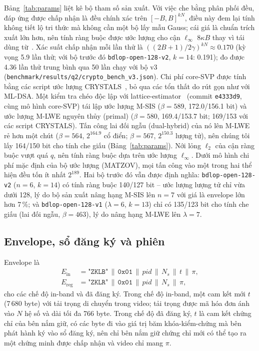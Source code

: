 \documentclass[journal]{IEEEtran}
\newcommand{\pid}{\mathit{pid}}
\begin{document}


Bảng~\ref{tab:params} liệt kê bộ tham số sản xuất. Với việc che bằng phân phối
đều, đáp ứng được chấp nhận là đều chính xác trên $[-B,B]^{kN}$, điều này đem
lại tính không tiết lộ tri thức mà không cần một bộ lấy mẫu Gauss; cái giá là
chuẩn trích xuất lớn hơn, nên tính ràng buộc được ước lượng cho cận $\ell_\infty$
$8\kappa B$ thay vì tái dùng từ~\cite{ref:bdlop}. Xác suất chấp nhận mỗi lần thử
là $((2B+1)/2\gamma)^{kN}\approx0.170$ (kỳ vọng 5.9 lần thử; với bộ trước đó
\texttt{bdlop-open-128-v2}, $k=14$: 0.191); đo được 4.36 lần thử trung bình
qua 50 lần chạy với bộ v3 (\texttt{benchmark/results/q2/crypto\_bench\_v3.json}).
Chi phí core-SVP được tính bằng các
script ước lượng CRYSTALS~\cite{ref:crystalsestimates}, bỏ qua các tổn thất do
rút gọn như với ML-DSA. Một kiểm tra chéo độc lập với
lattice-estimator~\cite{ref:aps15,ref:latticeestimator} (commit
\texttt{e4333d9}, cùng mô hình core-SVP) tái lập ước lượng M-SIS ($\beta=589$,
172.0/156.1 bit) và ước lượng M-LWE nguyên thủy (primal) ($\beta=580$,
169.4/153.7 bit; 169/153 với các script CRYSTALS). Tấn công lai đối ngẫu
(dual-hybrid) của nó lên M-LWE rẻ hơn một chút ($\beta=564$, $2^{164.9}$ cổ
điển; $\beta=567$, $2^{150.3}$ lượng tử), nên chúng tôi lấy 164/150 bit cho
tính che giấu (Bảng~\ref{tab:params}). Nới lỏng $\ell_2$ của cận ràng buộc
vượt quá $q$, nên tính ràng buộc dựa trên ước lượng $\ell_\infty$. Dưới mô hình
chi phí mặc định của bộ ước lượng (MATZOV), mọi tấn công vào một trong hai thể
hiện đều tốn ít nhất $2^{189}$. Hai bộ trước đó vẫn được định nghĩa:
\texttt{bdlop-open-128-v2} ($n=6$, $k=14$) có tính ràng buộc 140/127 bit --
ước lượng lượng tử chỉ vừa dưới 128, lý do bộ sản xuất nâng hạng M-SIS lên
$n=7$ với giá là envelope lớn hơn 7\,\%; và \texttt{bdlop-open-128-v1}
($\lambda=6$, $k=13$) chỉ có 135/123 bit cho tính che giấu (lai đối ngẫu,
$\beta=463$), lý do nâng hạng M-LWE lên $\lambda=7$.

\subsection{Envelope, sổ đăng ký và phiên}
Envelope là
\begin{align*}
E_{\mathrm{in}}  &= \texttt{"ZKLB"}\,\|\,\texttt{0x01}\,\|\,\pid\,\|\,N_s\,\|\,t\,\|\,\pi,\\
E_{\mathrm{reg}} &= \texttt{"ZKLR"}\,\|\,\texttt{0x01}\,\|\,\pid\,\|\,N_s\,\|\,\pi,
\end{align*}
cho các chế độ in-band và đã đăng ký. Trong chế độ in-band, một cam kết mới $t$
(7\,680 byte) với tải trọng di chuyển trong video; tải trọng được mã hóa đơn
ánh vào $N$ hệ số và dài tối đa 766 byte. Trong chế độ đã đăng ký, $t$ là cam
kết chứng chỉ của bên nắm giữ, có các byte đi vào giá trị băm khóa-kiểm-chứng mà
bên phát hành ký vào sổ đăng ký, nên chỉ bên nắm giữ chứng chỉ mới có thể tạo ra
một chứng minh được chấp nhận và video chỉ mang $\pi$.
\end{document}
